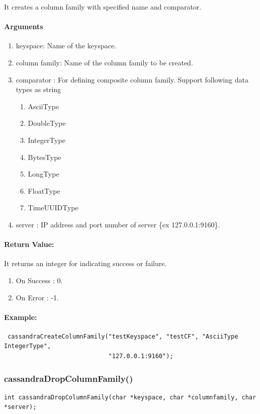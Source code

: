   It creates a column family with specified name and comparator.

  \paragraph{Arguments}
  \begin{enumerate}
   \item keyspace: Name of the keyspace.
   \item column family: Name of the column family to be created.
   \item comparator : For defining composite column family. Support following data types as string
		    \begin{enumerate}
		     \item AsciiType
		     \item DoubleType
		     \item IntegerType
		     \item BytesType
		     \item LongType
		     \item FloatType
		     \item TimeUUIDType
		    \end{enumerate}

   \item server : IP address and port number of server \{ex 127.0.0.1:9160\}.
  \end{enumerate}

 \paragraph{Return Value:}
 It returns an integer  for indicating success or failure.
\begin{enumerate}
 \item On Success : 0.
 \item On Error   : -1.
\end{enumerate}
\paragraph{Example:}
\begin{verbatim}
 cassandraCreateColumnFamily("testKeyspace", "testCF", "AsciiType IntegerType", 
                             "127.0.0.1:9160");
\end{verbatim}


\subsubsection{cassandraDropColumnFamily()}
\begin{verbatim}
int cassandraDropColumnFamily(char *keyspace, char *columnfamily, char *server);
\end{verbatim}

